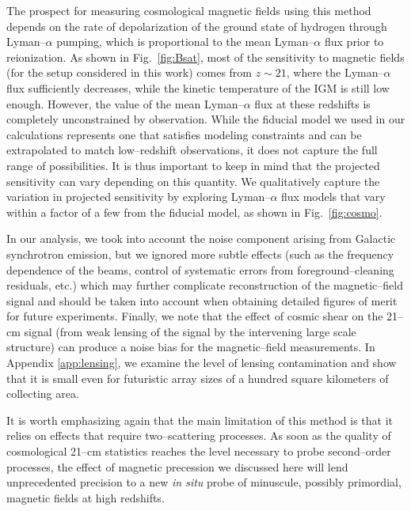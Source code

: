 The prospect for measuring cosmological magnetic fields using this method depends on the rate of depolarization of the ground state of hydrogen through Lyman--$\alpha$ pumping, which is proportional to the mean Lyman--$\alpha$ flux prior to reionization. As shown in Fig.~\ref{fig:Bsat}, most of the sensitivity to magnetic fields (for the setup considered in this work) comes from $z\sim 21$, where the Lyman--$\alpha$ flux sufficiently decreases, while the kinetic temperature of the IGM is still low enough. However, the value of the mean Lyman--$\alpha$ flux at these redshifts is completely unconstrained by observation. While the fiducial model we used in our calculations represents one that satisfies modeling constraints and can be extrapolated to match low--redshift observations, it does not capture the full range of possibilities. It is thus important to keep in mind that the projected sensitivity can vary depending on this quantity. We qualitatively capture the variation in projected sensitivity by exploring Lyman--$\alpha$ flux models that vary within a factor of a few from the fiducial model, as shown in Fig.~\ref{fig:cosmo}.

In our analysis, we took into account the noise component arising from Galactic synchrotron emission, but we ignored more subtle effects (such as the frequency dependence of the beams, control of systematic errors from foreground--cleaning residuals, etc.) which may further complicate reconstruction of the magnetic--field signal and should be taken into account when obtaining detailed figures of merit for future experiments.
Finally, we note that the effect of cosmic shear on the 21--cm signal (from weak lensing of the signal by the intervening large scale structure) can produce a noise bias for the magnetic--field measurements. In Appendix \ref{app:lensing}, we examine the level of lensing contamination and show that it is small even for futuristic array sizes of a hundred square kilometers of collecting area. 

It is worth emphasizing again that the main limitation of this method is that it relies on effects that require two--scattering processes. As soon as the quality of cosmological 21--cm statistics reaches the level necessary to probe second--order processes, the effect of magnetic precession we discussed here will lend unprecedented precision to a new \textit{in situ} probe of minuscule, possibly primordial, magnetic fields at high redshifts. 

  